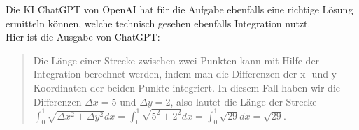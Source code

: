 \documentclass[main.tex]{subfiles}
\begin{document}
Die KI ChatGPT von OpenAI hat für die Aufgabe ebenfalls eine richtige Lösung ermitteln können, welche technisch gesehen ebenfalls Integration nutzt.\\
Hier ist die Ausgabe von ChatGPT:

\begin{quote}
    \textcolor[rgb]{0.05,0.73,0.15}{
        Die Länge einer Strecke zwischen zwei Punkten kann mit Hilfe der Integration berechnet werden, indem man die Differenzen der x- und y-Koordinaten der beiden Punkte integriert. In diesem Fall haben wir die Differenzen $\Delta x=5$ und $\Delta y=2$, also lautet die Länge der Strecke
        $\int _{0}^{1}\sqrt{\Delta x^{2} +\Delta y^{2}} dx=\int _{0}^{1}\sqrt{5^{2} +2^{2}} dx=\int _{0}^{1}\sqrt{29} dx=\boxed{\sqrt{29}}$.
    }
\end{quote}
\end{document}
